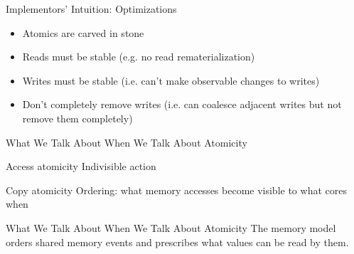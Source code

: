 \documentclass[notes]{beamer}
\begin{document}
\begin{frame}{Implementors' Intuition: Optimizations}
  \begin{itemize}
  \item Atomics are carved in stone
  \item Reads must be stable (e.g. no read rematerialization)
  \item Writes must be stable (i.e. can't make observable changes to writes)
  \item Don't completely remove writes (i.e. can coalesce adjacent writes but not remove them completely)
  \end{itemize}

\end{frame}

\begin{frame}{What We Talk About When We Talk About Atomicity}
  \begin{block}{Access atomicity}
    Indivisible action
  \end{block}

  \pause

  \begin{block}{Copy atomicity}
    Ordering: what memory accesses become visible to what cores when
  \end{block}

\end{frame}

\begin{frame}{What We Talk About When We Talk About Atomicity}
  The memory model orders shared memory events and prescribes what values can be read by them.

\end{frame}
\end{document}
